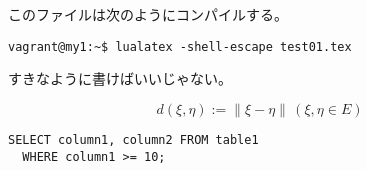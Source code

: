 \documentclass{jlreq}
\begin{document}
このファイルは次のようにコンパイルする。
\begin{verbatim}
vagrant@my1:~$ lualatex -shell-escape test01.tex
\end{verbatim}


すきなように書けばいいじゃない。

\begin{equation}
  d(\xi, \eta) := \lVert\xi-\eta\rVert \, (\xi, \eta \in E)
\end{equation}




\begin{verbatim}
SELECT column1, column2 FROM table1
  WHERE column1 >= 10;
\end{verbatim}
\end{document}
